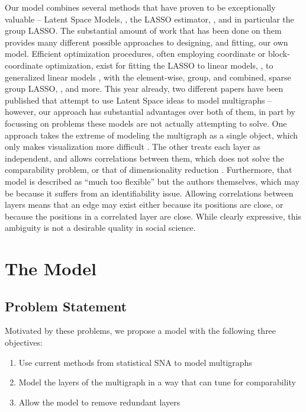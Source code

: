 \documentclass{article}
\begin{document}
Our model combines several methods that have proven to be exceptionally valuable -- Latent Space Models, \cite{hoff-2002}, the LASSO estimator, \cite{Friedman2008}, and in particular the group LASSO. The substantial amount of work that has been done on them provides many different possible approaches to designing, and fitting, our own model. Efficient optimization procedures, often employing coordinate or block-coordinate optimization, exist for fitting the LASSO to linear models, \cite{Friedman2008}, to generalized linear models \cite{Friedman2010}, with the element-wise, group, and combined, sparse group LASSO, \cite{Vincent, Qin, Wu2008}, and more. This year already, two different papers have been published that attempt to use Latent Space ideas to model multigraphs -- however, our approach has substantial advantages over both of them, in part by focussing on problems these models are not actually attempting to solve. One approach takes the extreme of modeling the multigraph as a single object, which only makes visualization more difficult \cite{gollini-2017}. The other treats each layer as independent, and allows correlations between them, which does not solve the comparability problem, or that of dimensionality reduction \cite{salter-townshend2017}. Furthermore, that model is described as ``much too flexible'' but the authors themselves, which may be because it suffers from an identifiability issue. Allowing correlations between layers means that an edge may exist either because its positions are close, or because the positions in a correlated layer are close. While clearly expressive, this ambiguity is not a desirable quality in social science.



\section{The Model}
\subsection{Problem Statement}
Motivated by these problems, we propose a model with the following three objectives:

\begin{enumerate}
\item Use current methods from statistical SNA to model multigraphs
\item Model the layers of the multigraph in a way that can tune for comparability
\item Allow the model to remove redundant layers
\end{enumerate}
\end{document}
